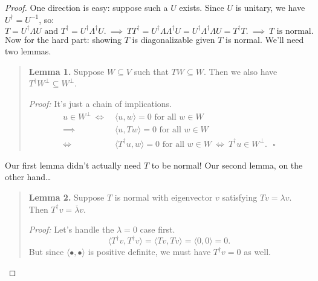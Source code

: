 \begin{proof}
    One direction is easy: suppose such a $U$ exists.  Since $U$ is unitary, we have $U^{\dagger} = U^{-1}$, so:
    \[ T = U^{\dagger} \Lambda U \text{ and } T^{\dagger} = U^{\dagger}\Lambda^{\dagger} U. ~ \implies ~ TT^{\dagger} = U^{\dagger} \Lambda \Lambda^{\dagger}U = U^{\dagger} \Lambda^{\dagger} \Lambda U = T^{\dagger}T. ~ \implies ~ T \text{ is normal.} \]
    Now for the hard part: showing $T$ is diagonalizable given $T$ is normal.  We'll need two lemmas.
    \begin{quote}
        \textbf{Lemma 1.} Suppose $W \subseteq V$ such that $TW \subseteq W$.  Then we also have $T^{\dagger}W^{\perp} \subseteq W^{\perp}$.

        \emph{Proof:} It's just a chain of implications.
        \begin{align*} u \in W^{\perp} ~ \iff ~ & \langle u, w \rangle = 0 \text{ for all } w \in W \\ \implies ~ & \langle u, Tw \rangle = 0 \text{ for all } w \in W \\ \iff ~ & \langle T^{\dagger}u, w \rangle = 0 \text{ for all } w \in W ~ \iff ~ T^{\dagger}u \in W^{\perp}. ~~~ \square \end{align*} \vspace{-0.8cm}
    \end{quote}
    Our first lemma didn't actually need $T$ to be normal!  Our second lemma, on the other hand\dots
    \begin{quote}
        \textbf{Lemma 2.} Suppose $T$ is normal with eigenvector $v$ satisfying $Tv = \lambda v$.  Then $T^{\dagger}v = \overline{\lambda} v$.

        \emph{Proof:} Let's handle the $\lambda = 0$ case first.
        \[ \langle T^{\dagger}v, T^{\dagger}v \rangle = \langle Tv, Tv \rangle = \langle 0, 0 \rangle = 0. \]
        But since $\langle \bullet, \bullet \rangle$ is positive definite, we must have $T^{\dagger}v = 0$ as well.


\end{quote}
\end{proof}
